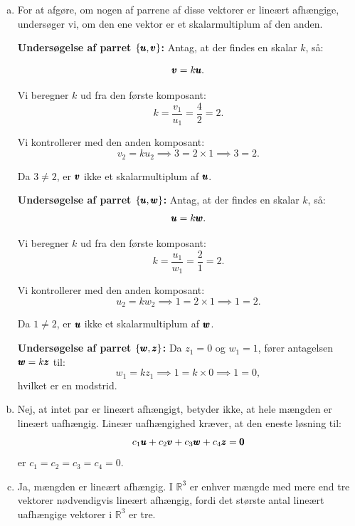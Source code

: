 \begin{solution}
    \begin{enumerate}[(a)]
        \item 
        For at afgøre, om nogen af parrene af disse vektorer er lineært afhængige, undersøger vi, om den ene vektor er et skalarmultiplum af den anden.

        \textbf{Undersøgelse af parret $\{\pmb{u}, \pmb{v}\}$:} Antag, at der findes en skalar $k$, så:
    
        \[
        \pmb{v} = k \pmb{u}.
        \]
        
        Vi beregner $k$ ud fra den første komposant:
        \[
        k = \dfrac{v_1}{u_1} = \dfrac{4}{2} = 2.
        \]
        
        Vi kontrollerer med den anden komposant:
        \[
        v_2 = k u_2 \implies 3 = 2 \times 1 \implies 3 = 2.
        \]
        
        Da $3 \ne 2$, er $\pmb{v}$ ikke et skalarmultiplum af $\pmb{u}$.
        
        \textbf{Undersøgelse af parret $\{\pmb{u}, \pmb{w}\}$:} Antag, at der findes en skalar $k$, så:
        \[
        \pmb{u} = k \pmb{w}.
        \]
        
        Vi beregner $k$ ud fra den første komposant:
        \[
        k = \dfrac{u_1}{w_1} = \dfrac{2}{1} = 2.
        \]
        
        Vi kontrollerer med den anden komposant:
        \[
        u_2 = k w_2 \implies 1 = 2 \times 1 \implies 1 = 2.
        \]
        
        Da $1 \ne 2$, er $\pmb{u}$ ikke et skalarmultiplum af $\pmb{w}$.
        
        \textbf{Undersøgelse af parret $\{\pmb{w}, \pmb{z}\}$:} Da $z_1 = 0$ og $w_1 = 1$, fører antagelsen $\pmb{w} = k \pmb{z}$ til:
        \[
        w_1 = k z_1 \implies 1 = k \times 0 \implies 1 = 0,
        \] hvilket er en modstrid.
    
        \item Nej, at intet par er lineært afhængigt, betyder ikke, at hele mængden er lineært uafhængig. Lineær uafhængighed kræver, at den eneste løsning til:
        \[
        c_1 \pmb{u} + c_2 \pmb{v} + c_3 \pmb{w} + c_4 \pmb{z} = \pmb{0}
        \]
        er $c_1 = c_2 = c_3 = c_4 = 0$.
        
        \item Ja, mængden er lineært afhængig. I $\mathbb{R}^3$ er enhver mængde med mere end tre vektorer nødvendigvis lineært afhængig, fordi det største antal lineært uafhængige vektorer i $\mathbb{R}^3$ er tre.
    \end{enumerate}
        

\end{solution}
